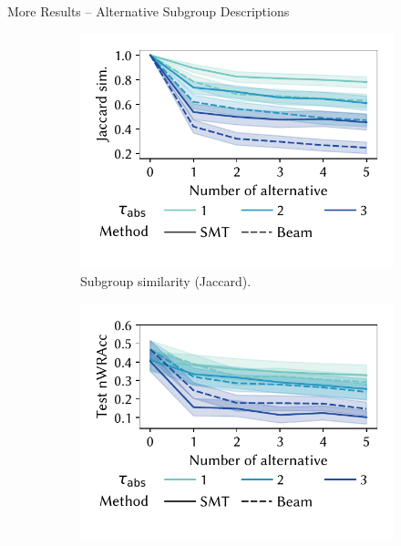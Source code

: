 \documentclass[en, navbaroff]{sdqbeamer}
\begin{document}
\begin{frame}[t]{More Results -- Alternative Subgroup Descriptions}
	\begin{figure}
		\centering
		\begin{subfigure}[t]{0.4\textwidth}
			\centering
			\includegraphics[width=\textwidth, trim=10 25 10 10, clip]{plots/csd-alternatives-jaccard.pdf}
			\caption{Subgroup similarity (Jaccard).}
			\label{fig:csd:alternatives-jaccard}
		\end{subfigure}
		\hspace{\kitcolumnsep}
		\begin{subfigure}[t]{0.4\textwidth}
			\centering
			\includegraphics[width=\textwidth, trim=10 25 10 10, clip]{plots/csd-alternatives-test-nwracc.pdf}

\end{subfigure}
\end{figure}
\end{frame}
\end{document}
